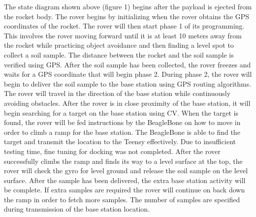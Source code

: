 \documentclass[journal,10pt,draftclsnofoot,onecolumn,compsoc]{IEEEtran} \usepackage[margin=0.75in]{geometry}
\begin{document}
\newpage
The state diagram shown above (figure 1) begins after the payload is ejected from the rocket body. The rover begins by initializing when the rover obtains the GPS coordinates of the rocket. The rover will then start phase 1 of its programming. This involves the rover moving forward until it is at least 10 meters away from the rocket while practicing object avoidance and then finding a level spot to collect a soil sample. The distance between the rocket and the soil sample is verified using GPS. After the soil sample has been collected, the rover freezes and waits for a GPS coordinate that will begin phase 2. During phase 2, the rover will begin to deliver the soil sample to the base station using GPS routing algorithms. The rover will travel in the direction of the base station while continuously avoiding obstacles. After the rover is in close proximity of the base station, it will begin searching for a target on the base station using CV. When the target is found, the rover will be fed instructions by the BeagleBone on how to move in order to climb a ramp for the base station. The BeagleBone is able to find the target and transmit the location to the Teensy effectively. Due to insufficient testing time, fine tuning for docking was not completed. After the rover successfully climbs the ramp and finds its way to a level surface at the top, the rover will check the gyro for level ground and release the soil sample on the level surface. After the sample has been delivered, the extra base station activity will be complete. If extra samples are required the rover will continue on back down the ramp in order to fetch more samples. The number of samples are specified during transmission of the base station location.
\end{document}
